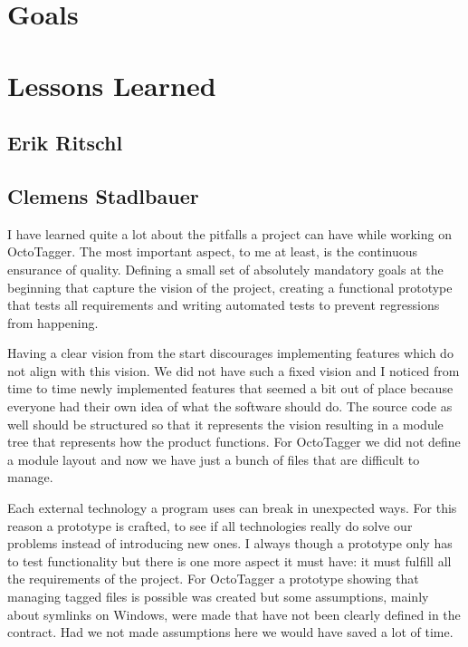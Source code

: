 \section{Goals}

\section{Lessons Learned}
\def\kapitelautor{}

\subsection{Erik Ritschl}


\subsection{Clemens Stadlbauer}

I have learned quite a lot about the pitfalls a project can have while working
on OctoTagger. The most important aspect, to me at least, is the continuous
ensurance of quality. Defining a small set of absolutely mandatory goals at the
beginning that capture the vision of the project, creating a functional
prototype that tests all requirements and writing automated tests to prevent
regressions from happening.

Having a clear vision from the start discourages implementing features which do
not align with this vision. We did not have such a fixed vision and I noticed
from time to time newly implemented features that seemed a bit out of place
because everyone had their own idea of what the software should do. The source
code as well should be structured so that it represents the vision resulting
in a module tree that represents how the product functions. For OctoTagger we
did not define a module layout and now we have just a bunch of files that are
difficult to manage.

Each external technology a program uses can break in unexpected ways. For this
reason a prototype is crafted, to see if all technologies really do solve our
problems instead of introducing new ones. I always though a prototype only has
to test functionality but there is one more aspect it must have: it must fulfill
all the requirements of the project. For OctoTagger a prototype showing that
managing tagged files is possible was created but some assumptions, mainly about
symlinks on Windows, were made that have not been clearly defined in the
contract. Had we not made assumptions here we would have saved a lot of time.

